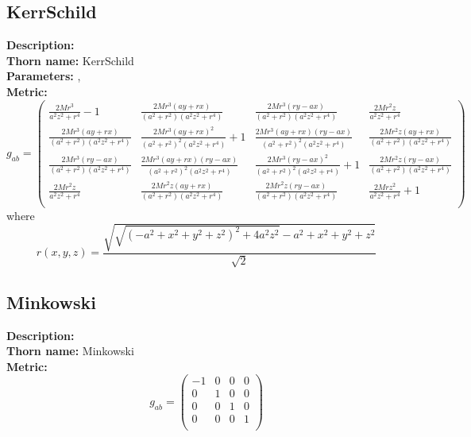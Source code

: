 \documentclass{article}
\begin{document}
\subsection{KerrSchild}
{\bf Description:}   \\
{\bf Thorn name:} KerrSchild \\
{\bf Parameters:} ,  \\
{\bf Metric:} \\
\begin{equation}
g_{ab} =
\left(
\begin{array}{cccc}
 \frac{2 M r^3}{a^2 z^2+r^4}-1 & \frac{2 M r^3 (a y+r x)}{\left(a^2+r^2\right) \left(a^2 z^2+r^4\right)} & \frac{2 M r^3 (r y-a x)}{\left(a^2+r^2\right) \left(a^2 z^2+r^4\right)} & \frac{2 M r^2 z}{a^2 z^2+r^4} \\
 \frac{2 M r^3 (a y+r x)}{\left(a^2+r^2\right) \left(a^2 z^2+r^4\right)} & \frac{2 M r^3 (a y+r x)^2}{\left(a^2+r^2\right)^2 \left(a^2 z^2+r^4\right)}+1 & \frac{2 M r^3 (a y+r x) (r y-a x)}{\left(a^2+r^2\right)^2 \left(a^2 z^2+r^4\right)} & \frac{2 M r^2 z (a y+r x)}{\left(a^2+r^2\right) \left(a^2 z^2+r^4\right)} \\
 \frac{2 M r^3 (r y-a x)}{\left(a^2+r^2\right) \left(a^2 z^2+r^4\right)} & \frac{2 M r^3 (a y+r x) (r y-a x)}{\left(a^2+r^2\right)^2 \left(a^2 z^2+r^4\right)} & \frac{2 M r^3 (r y-a x)^2}{\left(a^2+r^2\right)^2 \left(a^2 z^2+r^4\right)}+1 & \frac{2 M r^2 z (r y-a x)}{\left(a^2+r^2\right) \left(a^2 z^2+r^4\right)} \\
 \frac{2 M r^2 z}{a^2 z^2+r^4} & \frac{2 M r^2 z (a y+r x)}{\left(a^2+r^2\right) \left(a^2 z^2+r^4\right)} & \frac{2 M r^2 z (r y-a x)}{\left(a^2+r^2\right) \left(a^2 z^2+r^4\right)} & \frac{2 M r z^2}{a^2 z^2+r^4}+1 \\
\end{array}
\right)
\end{equation}
where
\begin{equation}
r(x,y,z)=\frac{\sqrt{\sqrt{\left(-a^2+x^2+y^2+z^2\right)^2+4 a^2 z^2}-a^2+x^2+y^2+z^2}}{\sqrt{2}}
\end{equation}

\subsection{Minkowski}
{\bf Description:}   \\
{\bf Thorn name:} Minkowski \\
{\bf Metric:} \\
\begin{equation}
g_{ab} =
\left(
\begin{array}{cccc}
 -1 & 0 & 0 & 0 \\
 0 & 1 & 0 & 0 \\
 0 & 0 & 1 & 0 \\
 0 & 0 & 0 & 1 \\
\end{array}
\right)
\end{equation}
\end{document}
